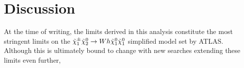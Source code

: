 \section{Discussion}

At the time of writing, the limits derived in this analysis constitute the most stringent limits on the $\tilde{\chi}_1^\pm\tilde{\chi}_2^0\rightarrow Wh\tilde{\chi}_1^0\tilde{\chi}_1^0$ simplified model set by ATLAS. Although this is ultimately bound to change with new searches extending these limits even further, 





